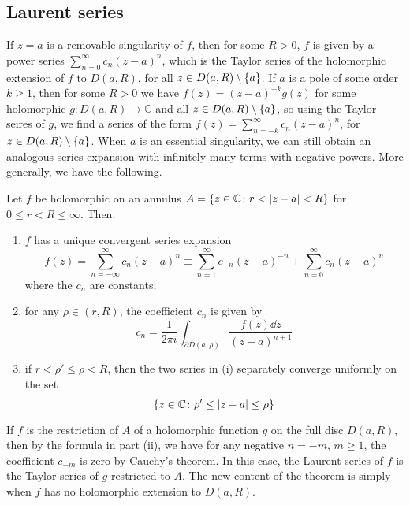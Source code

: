 \subsection{Laurent series}
If \( z = a \) is a removable singularity of \( f \), then for some \( R > 0 \), \( f \) is given by a power series \( \sum_{n = 0}^\infty c_n(z-a)^n \), which is the Taylor series of the holomorphic extension of \( f \) to \( D(a,R) \), for all \( z \in D(a,R) \setminus \qty{a} \).
If \( a \) is a pole of some order \( k \geq 1 \), then for some \( R > 0 \) we have \( f(z) = (z-a)^{-k} g(z) \) for some holomorphic \( g \colon D(a,R) \to \mathbb C \) and all \( z \in D(a,R) \setminus \qty{a} \), so using the Taylor seires of \( g \), we find a series of the form \( f(z) = \sum_{n=-k}^\infty c_n (z-a)^n \), for \( z \in D(a,R) \setminus \qty{a} \).
When \( a \) is an essential singularity, we can still obtain an analogous series expansion with infinitely many terms with negative powers.
More generally, we have the following.
\begin{theorem}
	Let \( f \) be holomorphic on an annulus \( A = \qty{z \in \mathbb C \colon r < \abs{z-a} < R} \) for \( 0 \leq r < R \leq \infty \).
	Then:
	\begin{enumerate}
		\item \( f \) has a unique convergent series expansion
		      \[
			      f(z) = \sum_{n = -\infty}^\infty c_n (z-a)^n \equiv \sum_{n=1}^\infty c_{-n} (z-a)^{-n} + \sum_{n=0}^\infty c_n (z-a)^n
		      \]
		      where the \( c_n \) are constants;
		\item for any \( \rho \in (r,R) \), the coefficient \( c_n \) is given by
		      \[
			      c_n = \frac{1}{2 \pi i} \int_{\partial D(a,\rho)} \frac{f(z) \dd{z}}{(z-a)^{n+1}}
		      \]
		\item if \( r < \rho' \leq \rho < R \), then the two series in (i) separately converge uniformly on the set
		      \[
			      \qty{z \in \mathbb C \colon \rho' \leq \abs{z-a} \leq \rho}
		      \]
	\end{enumerate}
\end{theorem}
\begin{remark}
	If \( f \) is the restriction of \( A \) of a holomorphic function \( g \) on the full disc \( D(a,R) \), then by the formula in part (ii), we have for any negative \( n = -m \), \( m \geq 1 \), the coefficient \( c_{-m} \) is zero by Cauchy's theorem.
	In this case, the Laurent series of \( f \) is the Taylor series of \( g \) restricted to \( A \).
	The new content of the theorem is simply when \( f \) has no holomorphic extension to \( D(a,R) \).
\end{remark}

